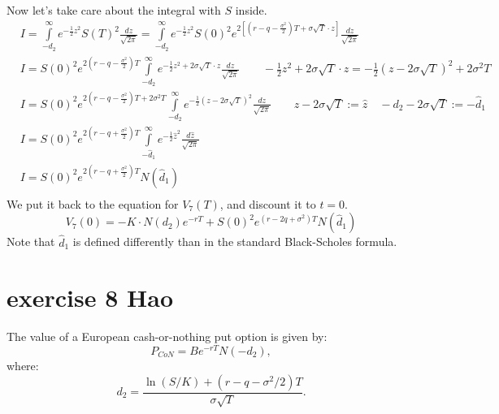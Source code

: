 \documentclass{article}
\begin{document}
Now let's take care about the integral with $S$ inside.
\begin{align}
     & I=\int\limits_{-{{d}_{2}}}^{\infty }{{{e}^{-\frac{1}{2}{{z}^{2}}}}S{{\left( T \right)}^{2}}\frac{dz}{\sqrt{2\pi }}}=\int\limits_{-{{d}_{2}}}^{\infty }{{{e}^{-\frac{1}{2}{{z}^{2}}}}S{{\left( 0 \right)}^{2}}{{e}^{2\left[ \left( r-q-\frac{{{\sigma }^{2}}}{2} \right)T+\sigma \sqrt{T}\cdot z \right]}}\frac{dz}{\sqrt{2\pi }}} \\
     & I=S{{\left( 0 \right)}^{2}}{{e}^{2\left( r-q-\frac{{{\sigma }^{2}}}{2} \right)T}}\int\limits_{-{{d}_{2}}}^{\infty }{{{e}^{-\frac{1}{2}{{z}^{2}}+2\sigma \sqrt{T}\cdot z}}\frac{dz}{\sqrt{2\pi }}}\qquad -\frac{1}{2}{{z}^{2}}+2\sigma \sqrt{T}\cdot z=-\frac{1}{2}{{\left( z-2\sigma \sqrt{T} \right)}^{2}}+2{{\sigma }^{2}}T     \\
     & I=S{{\left( 0 \right)}^{2}}{{e}^{2\left( r-q-\frac{{{\sigma }^{2}}}{2} \right)T+2{{\sigma }^{2}}T}}\int\limits_{-{{d}_{2}}}^{\infty }{{{e}^{-\frac{1}{2}{{\left( z-2\sigma \sqrt{T} \right)}^{2}}}}\frac{dz}{\sqrt{2\pi }}}\qquad z-2\sigma \sqrt{T}:=\hat{z}\quad -{{d}_{2}}-2\sigma \sqrt{T}:=-{{{\hat{d}}}_{1}}                \\
     & I=S{{\left( 0 \right)}^{2}}{{e}^{2\left( r-q+\frac{{{\sigma }^{2}}}{2} \right)T}}\int\limits_{-{{{\hat{d}}}_{1}}}^{\infty }{{{e}^{-\frac{1}{2}{{{\hat{z}}}^{2}}}}\frac{d\hat{z}}{\sqrt{2\pi }}}                                                                                                                                   \\
     & I=S{{\left( 0 \right)}^{2}}{{e}^{2\left( r-q+\frac{{{\sigma }^{2}}}{2} \right)T}}N\left( {{{\hat{d}}}_{1}} \right)                                                                                                                                                                                                                \\
\end{align}
We put it back to the equation for $V_7(T)$, and discount it to $t=0$.
\[{{V}_{7}}\left( 0 \right)=-K\cdot N\left( {{d}_{2}} \right) e^{-rT} +S{{\left( 0 \right)}^{2}}{{e}^{\left( r - 2q + {\sigma }^{2} \right)T}}N\left( {{{\hat{d}}}_{1}} \right)\]
Note that $\hat{d}_1$ is defined differently than in the standard Black-Scholes formula.


\section{exercise 8 Hao}
The value of a European cash-or-nothing put option is given by:
\[
P_{CoN} = B e^{-rT} N(-d_2),
\]
where:
\[
d_2 = \frac{\ln(S/K) + (r - q - \sigma^2/2)T}{\sigma \sqrt{T}}.
\]
\end{document}
